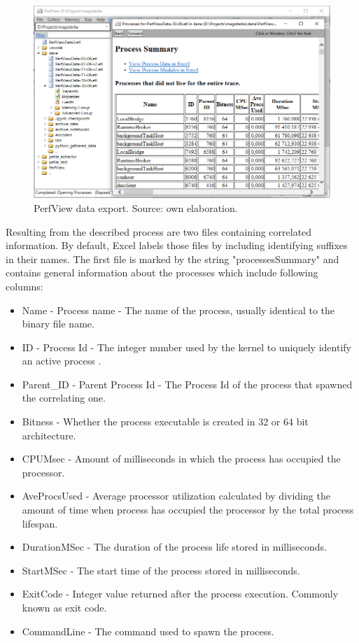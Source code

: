 \documentclass[a4paper,twoside,12pt]{book}
\begin{document}
\begin{figure}
	\centering
	\includegraphics[scale=0.55]{images/perf_export}
	\caption{PerfView data export. Source: own elaboration.}
	\label{fig:PerfViewexport}
 \end{figure}

Resulting from the described process are two files containing correlated information. By 
default, Excel labels those files by including identifying suffixes in their names. The 
first file is marked by the string "processesSummary" and contains general information 
about the processes which include following columns:
\begin{itemize}
	\item Name - Process name - The name of the process, usually identical to the binary 
	file name.
	\item ID - Process Id - The integer number used by the kernel to uniquely identify 
	an active process \cite{bib:MicrosoftWinInternals}.
	\item Parent\_ID - Parent Process Id - The Process Id of the process that spawned the 
	correlating one.
	\item Bitness - Whether the process executable is created in 32 or 64 bit architecture.
	\item CPUMsec - Amount of milliseconds in which the process has occupied the processor. 
	\item AveProcsUsed - Average processor utilization calculated by dividing the amount
	of time when process has occupied the processor by the total process lifespan. 
	\item DurationMSec - The duration of the process life stored in milliseconds.
	\item StartMSec - The start time of the process stored in milliseconds.
	\item ExitCode - Integer value returned after the process execution. Commonly known as 
	exit code.
	\item CommandLine - The command used to spawn the process.
\end{itemize}
\end{document}
